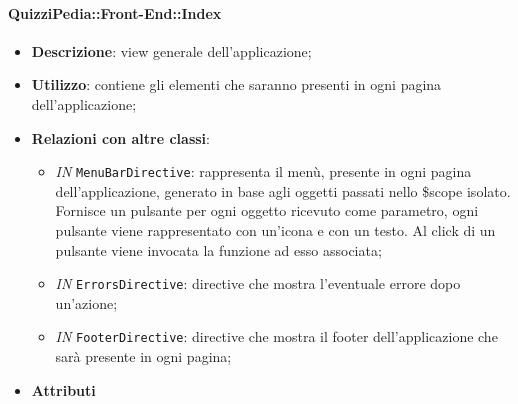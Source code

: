 	
	\paragraph{QuizziPedia::Front-End::Index}
	\begin{itemize}
		\item \textbf{Descrizione}: view generale dell'applicazione;
		\item \textbf{Utilizzo}: contiene gli elementi che saranno presenti in ogni pagina dell'applicazione;
		\item \textbf{Relazioni con altre classi}:
		\begin{itemize}
			\item \textit{IN} \texttt{MenuBarDirective}: rappresenta il menù, presente in ogni pagina dell'applicazione, generato in base agli oggetti passati nello \$scope isolato. Fornisce un pulsante per ogni oggetto ricevuto come parametro, ogni pulsante viene rappresentato con un’icona e con un testo. Al click di un pulsante viene invocata la funzione ad esso associata;
			\item \textit{IN} \texttt{ErrorsDirective}: directive che mostra l'eventuale errore dopo un'azione;
			\item \textit{IN} \texttt{FooterDirective}: directive che mostra il footer dell'applicazione che sarà presente in ogni pagina;
		\end{itemize}
		\item \textbf{Attributi}
	\end{itemize}
